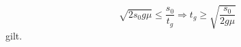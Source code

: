 \begin{Answer}[ref = ampel]
\begin{equation}
	\boxed{
	\sqrt{2s_0g\mu} \leq \frac{s_0}{t_g} \Rightarrow t_g \geq  \sqrt{\frac{s_0}{2g\mu}}}
	\end{equation}
	gilt.\\
\end{Answer}